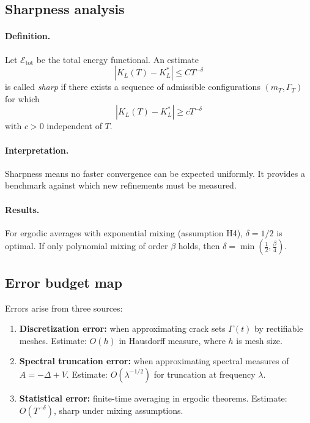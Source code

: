 \subsection{Sharpness analysis}
\paragraph{Definition.}
Let $\mathcal{E}_{\mathrm{tot}}$ be the total energy functional.  
An estimate 
\[
  |K_L(T) - K_L^*| \leq C T^{-\delta}
\]
is called \emph{sharp} if there exists a sequence of admissible configurations $(m_T,\Gamma_T)$ 
for which
\[
  |K_L(T) - K_L^*| \geq c T^{-\delta}
\]
with $c>0$ independent of $T$.

\paragraph{Interpretation.}
Sharpness means no faster convergence can be expected uniformly.  
It provides a benchmark against which new refinements must be measured.

\paragraph{Results.}
For ergodic averages with exponential mixing (assumption H4), 
$\delta = 1/2$ is optimal.  
If only polynomial mixing of order $\beta$ holds, then $\delta = \min(\tfrac{1}{2},\tfrac{\beta}{4})$.

\subsection{Error budget map}
Errors arise from three sources:
\begin{enumerate}[label=(E\arabic*)]
  \item \textbf{Discretization error:} when approximating crack sets $\Gamma(t)$ by rectifiable meshes.  
  Estimate: $O(h)$ in Hausdorff measure, where $h$ is mesh size.
  \item \textbf{Spectral truncation error:} when approximating spectral measures of $A=-\Delta+V$.  
  Estimate: $O(\lambda^{-1/2})$ for truncation at frequency $\lambda$.
  \item \textbf{Statistical error:} finite-time averaging in ergodic theorems.  
  Estimate: $O(T^{-\delta})$, sharp under mixing assumptions.
\end{enumerate}

